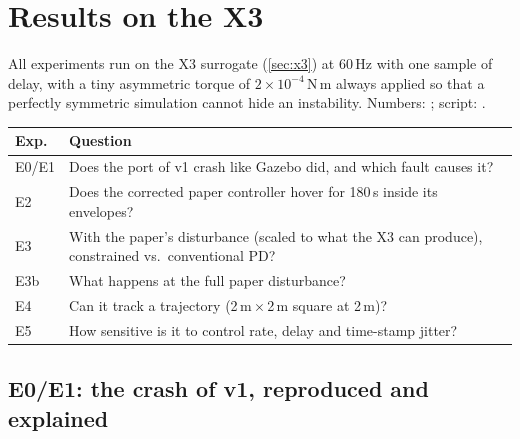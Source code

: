 \section{Results on the X3}
\label{sec:x3res}

All experiments run on the X3 surrogate (\cref{sec:x3}) at 60\,Hz with one sample of delay, with a tiny asymmetric
torque of $2\times10^{-4}$\,N\,m always applied so that a perfectly symmetric simulation cannot hide an instability.
Numbers: ; script: .

\begin{center}\small
\begin{tabularx}{\linewidth}{@{}l X@{}}
\toprule
\textbf{Exp.} & \textbf{Question}\\
\midrule
E0/E1 & Does the port of v1 crash like Gazebo did, and which fault causes it?\\
E2 & Does the corrected paper controller hover for 180\,s inside its envelopes?\\
E3 & With the paper's disturbance (scaled to what the X3 can produce), constrained vs.\ conventional PD?\\
E3b & What happens at the full paper disturbance?\\
E4 & Can it track a trajectory (2\,m\,$\times$\,2\,m square at 2\,m)?\\
E5 & How sensitive is it to control rate, delay and time-stamp jitter?\\
\bottomrule
\end{tabularx}
\end{center}

\subsection{E0/E1: the crash of v1, reproduced and explained}



